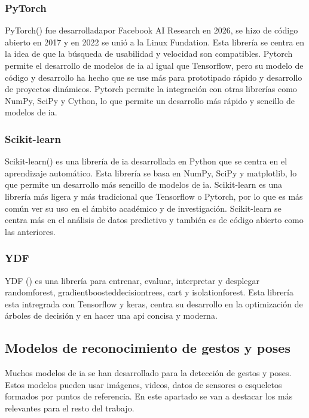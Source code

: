 \subsubsection{PyTorch}
PyTorch(\cite{Ansel_PyTorch_2_Faster_2024}) fue desarrolladapor Facebook AI Research en 2026, se hizo de código abierto en 2017 y en 2022 se unió a la Linux Fundation. Esta librería se centra en la idea de que la búsqueda de usabilidad y velocidad son compatibles. Pytorch permite el desarrollo de modelos de \gls{ia} al igual que Tensorflow, pero su modelo de código y desarrollo ha hecho que se use más para prototipado rápido y desarrollo de proyectos dinámicos.
Pytorch permite la integración con otras librerías como NumPy, SciPy y Cython, lo que permite un desarrollo más rápido y sencillo de modelos de \gls{ia}.

\subsubsection{Scikit-learn}
Scikit-learn(\cite{scikit-learn}) es una librería de \gls{ia} desarrollada en Python que se centra en el aprendizaje automático. Esta librería se basa en NumPy, SciPy y matplotlib, lo que permite un desarrollo más sencillo de modelos de \gls{ia}. Scikit-learn es una librería más ligera y más tradicional que Tensorflow o Pytorch, por lo que es más común ver su uso en el ámbito académico y de investigación. Scikit-learn se centra más en el análisis de datos predictivo y también es de código abierto como las anteriores.

\subsubsection{YDF}
YDF (\cite{GBBSP23}) es una librería para entrenar, evaluar, interpretar y desplegar \gls{randomforest}, \glspl{gradientboosteddecisiontree}, \gls{cart} y \gls{isolationforest}. Esta librería esta intregrada con Tensorflow y keras, centra su desarrollo en la optimización de árboles de decisión y en hacer una \gls{api} concisa y moderna.

\subsection{Modelos de reconocimiento de gestos y poses}

Muchos modelos de \gls{ia} se han desarrollado para la detección de gestos y poses. Estos modelos pueden usar imágenes, videos, datos de sensores o esqueletos formados por puntos de referencia. En este apartado se van a destacar los más relevantes para el resto del trabajo.

